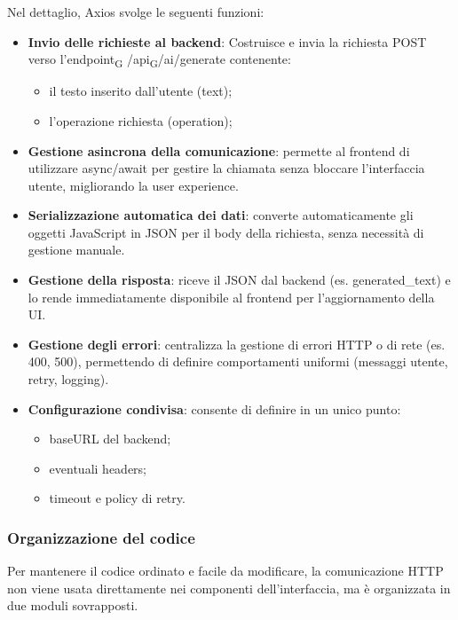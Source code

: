 \documentclass[11pt,a4paper]{article}
\newcommand{\gls}[1]{#1\textsubscript{G}}
\begin{document}
Nel dettaglio, Axios svolge le seguenti funzioni:
\begin{itemize}
\item \textbf{Invio delle richieste al backend}:
Costruisce e invia la richiesta POST verso l’\gls{endpoint} /\gls{api}/ai/generate contenente:
\begin{itemize}[label=\textbullet]
\item il testo inserito dall’utente (text);
\item l’operazione richiesta (operation);
\end{itemize}

\item \textbf{Gestione asincrona della comunicazione}: permette al frontend di utilizzare async/await per gestire la chiamata senza bloccare l’interfaccia utente, migliorando la user experience.
\item \textbf{Serializzazione automatica dei dati}: converte automaticamente gli oggetti JavaScript in JSON per il body della richiesta, senza necessità di gestione manuale.
\item \textbf{Gestione della risposta}: riceve il JSON dal backend (es. generated\_text) e lo rende immediatamente disponibile al frontend per l’aggiornamento della UI.
\item \textbf{Gestione degli errori}: centralizza la gestione di errori HTTP o di rete (es. 400, 500), permettendo di definire comportamenti uniformi (messaggi utente, retry, logging).
\item \textbf{Configurazione condivisa}: consente di definire in un unico punto:
\begin{itemize}[label=\textbullet]
\item baseURL del backend;
\item eventuali headers;
\item timeout e policy di retry.
\end{itemize}
\end{itemize}

\subsubsection{Organizzazione del codice}
Per mantenere il codice ordinato e facile da modificare, la comunicazione HTTP non viene usata direttamente nei componenti dell'interfaccia, ma è organizzata in due moduli sovrapposti.
\end{document}
